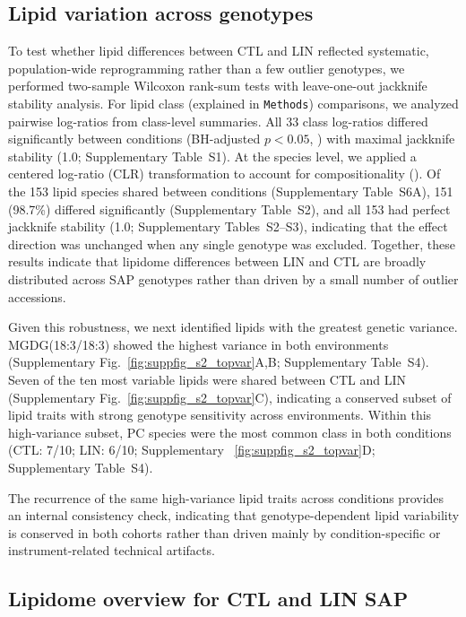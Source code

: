 \documentclass[9pt,twocolumn,twoside]{rilabRxiv}
\begin{document}
\subsection*{Lipid variation across genotypes}

To test whether lipid differences between CTL and LIN reflected systematic, population-wide reprogramming rather than a few outlier genotypes, we performed two-sample Wilcoxon rank-sum tests with leave-one-out jackknife stability analysis. For lipid class (explained in \texttt{Methods}) comparisons, we analyzed pairwise log-ratios from class-level summaries. All 33 class log-ratios differed significantly between conditions (BH-adjusted $p<0.05$, \cite{Benjamini1995}) with maximal jackknife stability (1.0; Supplementary Table~S1). At the species level, we applied a centered log-ratio (CLR) transformation to account for compositionality (\cite{Aitchison1982}). Of the 153 lipid species shared between conditions (Supplementary Table~S6A), 151 (98.7\%) differed significantly (Supplementary Table~S2), and all 153 had perfect jackknife stability (1.0; Supplementary Tables~S2--S3), indicating that the effect direction was unchanged when any single genotype was excluded. Together, these results indicate that lipidome differences between LIN and CTL are broadly distributed across SAP genotypes rather than driven by a small number of outlier accessions.

Given this robustness, we next identified lipids with the greatest genetic variance. MGDG(18:3/18:3) showed the highest variance in both environments (Supplementary Fig.~\ref{fig:suppfig_s2_topvar}A,B; Supplementary Table~S4). Seven of the ten most variable lipids were shared between CTL and LIN (Supplementary Fig.~\ref{fig:suppfig_s2_topvar}C), indicating a conserved subset of lipid traits with strong genotype sensitivity across environments. Within this high-variance subset, PC species were the most common class in both conditions (CTL: 7/10; LIN: 6/10; Supplementary ~\ref{fig:suppfig_s2_topvar}D; Supplementary Table~S4).

The recurrence of the same high-variance lipid traits across conditions provides an internal consistency check, indicating that genotype-dependent lipid variability is conserved in both cohorts rather than driven mainly by condition-specific or instrument-related technical artifacts.

\subsection{Lipidome overview for CTL and LIN SAP}
\end{document}

